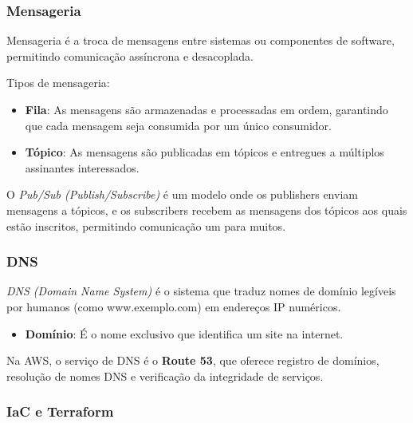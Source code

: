 \subsubsection{Mensageria}

Mensageria é a troca de mensagens entre sistemas ou componentes de software, permitindo comunicação assíncrona e desacoplada.

Tipos de mensageria:

\begin{itemize}
    \item \textbf{Fila}: As mensagens são armazenadas e processadas em ordem, garantindo que cada mensagem seja consumida por um único consumidor.
    \item \textbf{Tópico}: As mensagens são publicadas em tópicos e entregues a múltiplos assinantes interessados.
\end{itemize}

O \emph{Pub/Sub (Publish/Subscribe)} é um modelo onde os publishers enviam mensagens a tópicos, e os subscribers recebem as mensagens dos tópicos aos quais estão inscritos, permitindo comunicação um para muitos.

\subsubsection{DNS}

\emph{DNS (Domain Name System)} é o sistema que traduz nomes de domínio legíveis por humanos (como www.exemplo.com) em endereços IP numéricos.

\begin{itemize}
    \item \textbf{Domínio}: É o nome exclusivo que identifica um site na internet.
\end{itemize}

Na AWS, o serviço de DNS é o \textbf{Route 53}, que oferece registro de domínios, resolução de nomes DNS e verificação da integridade de serviços.

\subsubsection{IaC e Terraform}

